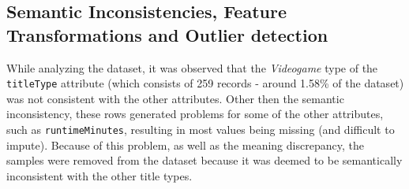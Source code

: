 \subsection{Semantic Inconsistencies, Feature Transformations and Outlier detection}
While analyzing the dataset, it was observed that the \textit{Videogame} type of the \texttt{titleType} attribute (which consists of 259
records - around 1.58\% of the dataset) was not consistent with the other attributes. 
Other then the semantic inconsistency, these rows
generated problems for some of the other attributes, such as \texttt{runtimeMinutes}, resulting in most
values being missing (and difficult to impute). Because of this problem, as well as the meaning discrepancy, the samples were removed from the dataset because it was deemed to be semantically inconsistent with the other title types.\\


